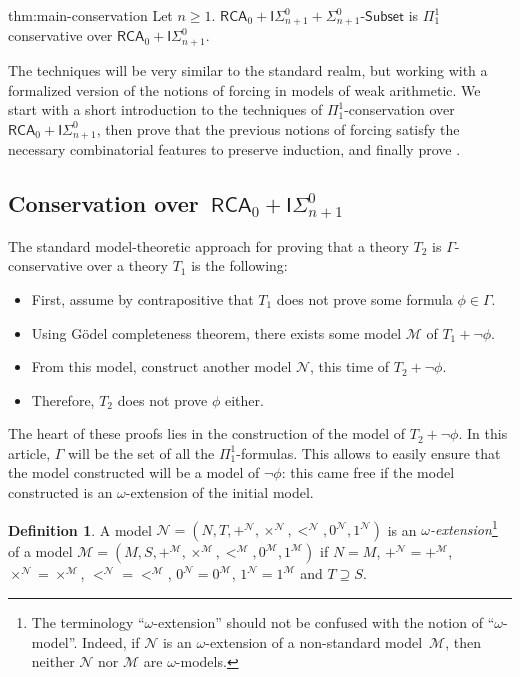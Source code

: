 \documentclass{article}
\def\N{\mathcal{N}}
\def\M{\mathcal{M}}
\newcommand{\ISig}{\mathsf{I}\Sigma^0}
\newcommand{\Sub}[1]{{#1}\mbox{-}\mathsf{Subset}}
\newcommand{\RCA}{\mathsf{RCA}}
\def\qt#1{``#1''}%
\numberwithin{theorem}{section}
\theoremstyle{definition}
\newtheorem{definition}[theorem]{Definition}
\begin{document}
\begin{repmaintheorem}{thm:main-conservation}
Let $n \geq 1$. $\RCA_0 + \ISig_{n+1} + \Sub{\Sigma^0_{n+1}}$ is $\Pi_1^1$ conservative over $\RCA_0 + \ISig_{n+1}$.
\end{repmaintheorem}

The techniques will be very similar to the standard realm, but working with a formalized version of the notions of forcing in models of weak arithmetic. We start with a short introduction to the techniques of $\Pi^1_1$-conservation over~$\RCA_0 + \ISig_{n+1}$, then prove that the previous notions of forcing satisfy the necessary combinatorial features to preserve induction, and finally prove .

\subsection{Conservation over~$\RCA_0 + \ISig_{n+1}$}

The standard model-theoretic approach for proving that a theory $T_2$ is $\Gamma$-conservative over a theory $T_1$ is the following:

\begin{itemize}
    \item First, assume by contrapositive that $T_1$ does not prove some formula $\phi \in \Gamma$.
    \item Using Gödel completeness theorem, there exists some model $\M$ of $T_1 + \neg \phi$.
    \item From this model, construct another model $\N$, this time of $T_2 + \neg \phi$.
    \item Therefore, $T_2$ does not prove $\phi$ either.
\end{itemize} 

The heart of these proofs lies in the construction of the model of $T_2 + \neg \phi$. In this article, $\Gamma$ will be the set of all the $\Pi_1^1$-formulas. This allows to easily ensure that the model constructed will be a model of $\neg \phi$: this came free if the model constructed is an $\omega$-extension of the initial model.

\begin{definition}
A model $\N = (N, T, +^\N, \times^\N, <^\N,0^{\N},1^\N)$ is an \emph{$\omega$-extension}\footnote{The terminology \qt{$\omega$-extension} should not be confused with the notion of \qt{$\omega$-model}. Indeed, if $\N$ is an $\omega$-extension of a non-standard model~$\M$, then neither $\N$ nor $\M$ are $\omega$-models.} of a model $\M = (M, S, +^\M, \times^\M, <^\M,0^\M,1^\M)$ if $N = M$, $+^\N = +^\M$, $\times^\N = \times^\M$, $<^\N = <^\M$, $0^\N = 0^\M$, $1^\N = 1^\M$ and $T \supseteq S$.
\end{definition}
\end{document}
